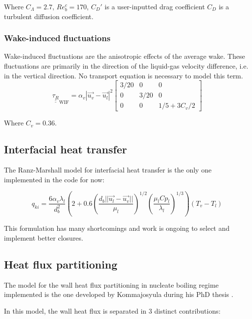Where $C_\Lambda = 2.7$, $Re_b^c = 170$, $C_D'$ is a user-inputted drag coefficient $C_D$ is a turbulent diffusion coefficient.

\subsubsection{Wake-induced fluctuations} 


Wake-induced fluctuations are the anisotropic effects of the average wake. These fluctuations are primarily in the direction of the liquid-gas velocity difference, i.e. in the vertical direction. No transport equation is necessary to model this term.
\begin{equation}
	\underline{\underline{\tau_R}}_{\text{WIF}} =
	\alpha_v |\overrightarrow{u_v}-\overrightarrow{u_l}|^2
	\begin{bmatrix}
		3/20 & 0 & 0 \\
		0 & 3/20 & 0 \\
		0 & 0 & 1/5+3C_v/2
	\end{bmatrix}
\end{equation}

Where $C_v = 0.36$.

\subsection{Interfacial heat transfer}

The Ranz-Marshall model \cite{RanzMarshall1952} for interfacial heat transfer is the only one implemented in the code for now:

\begin{equation}
	q_{ki} = \frac{6\alpha_v\lambda_l}{d_b^2}\left(2+0.6\left(\frac{d_b||\vec{u_l}-\vec{u_v}||}{\mu_l}\right)^{1/2}\left(\frac{\mu_l Cp_l}{\lambda_l}\right)^{1/3}\right)(T_v-T_l)
\end{equation}

This formulation has many shortcomings and work is ongoing to select and implement better closures.

\subsection{Heat flux partitioning}

The model for the wall heat flux partitioning in nucleate boiling regime implemented is the one developed by Kommajosyula during his PhD thesis \cite{Ravik2020}.

In this model, the wall heat flux is separated in 3 distinct contributions:

